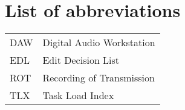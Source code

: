 \chapter*{List of abbreviations}

\begin{tabular}{l l}
DAW & Digital Audio Workstation \\
EDL & Edit Decision List \\
ROT & Recording of Transmission \\
TLX & Task Load Index
\end{tabular}

